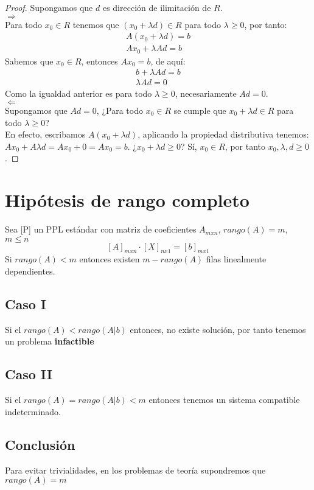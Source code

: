 \documentclass[11pt,fleqn]{book} %
\begin{document}
\begin{proof}
	Supongamos que $d$ es dirección de ilimitación de $R$. \\
	
	$\Rightarrow$ \\
	
	Para todo $x_0 \in R$ tenemos que $(x_0+\lambda d) \in R$ para todo $\lambda \geq 0$, por tanto:
	\begin{eqnarray}
		A(x_0+\lambda d) = b \\
		Ax_0+\lambda A d = b
	\end{eqnarray}
	Sabemos que $x_0 \in R$, entonces $Ax_0=b$, de aquí:
	\begin{eqnarray}
	b+\lambda A d = b \\
	\lambda A d = 0
	\end{eqnarray}
	Como la igualdad anterior es para todo $\lambda \geq 0$, necesariamente $Ad=0$. \\
	$\Leftarrow$ \\
	Supongamos que $Ad=0$, ¿Para todo $x_0 \in R$ se cumple que $x_0 + \lambda d  \in R$ para todo $\lambda \geq 0$? \\
	En efecto, escribamos $A(x_0+\lambda d)$, aplicando la propiedad distributiva tenemos: \\
	$Ax_0+A \lambda d=Ax_0+0=Ax_0=b$. ¿$x_0+\lambda d \geq 0$? Sí, $x_0 \in R$, por tanto $x_0, \lambda, d \geq 0$.  
\end{proof}

\section{Hipótesis de rango completo}
Sea [P] un PPL estándar con matriz de coeficientes $A_{mxn}$, $rango(A)=m$, $m\leq n$ \\
$$[A]_{mxn} \cdot [X]_{nx1}=[b]_{mx1}$$
Si $rango(A)<m$ entonces existen $m-rango(A)$ filas linealmente dependientes.
\subsection*{Caso I}
Si el $rango(A)<rango(A|b)$ entonces, no existe solución, por tanto tenemos un problema \textbf{infactible}
\subsection*{Caso II}
Si el $rango(A)=rango(A|b)<m$ entonces tenemos un sistema compatible indeterminado.
\subsection*{Conclusión}
Para evitar trivialidades, en los problemas de teoría supondremos que $rango(A)=m$
\end{document}
